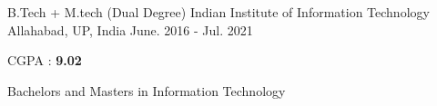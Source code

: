 \documentclass[11pt, a4paper]{awesome-cv} %
\begin{document}
\makecvheader %



\begin{cventries}

  \cventry
    {B.Tech + M.tech (Dual Degree)} %
    {Indian Institute of Information Technology} %
    {Allahabad, UP, India} %
    {June. 2016 - Jul. 2021} %
    {
      \begin{cvitems} %
        \item{CGPA : \textbf{9.02}}
        \item{ Bachelors and Masters in Information Technology}
      \end{cvitems}
    }

\end{cventries}



\end{document}
